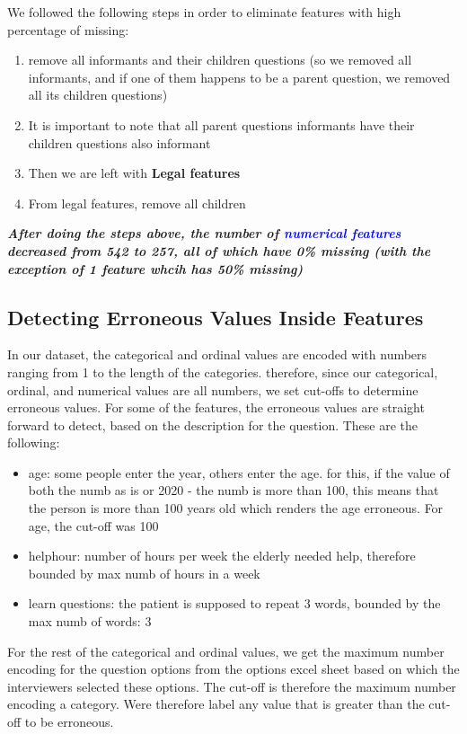 \documentclass{article}
\begin{document}
We followed the following steps in order to eliminate features with high percentage of missing:
\begin{enumerate}
\item remove all informants and their children questions (so we removed all informants, and if one of them happens to be a parent question, we removed all its children questions)

\item It is important to note that all parent questions informants have their children questions also informant

\item Then we are left with \textbf{Legal features}

\item From legal features, remove all children
\end{enumerate} 

\textbf{\textit{After doing the steps above, the number of \textcolor{blue}{numerical features} decreased from 542 to 257, all of which have 0\% missing (with the exception of 1 feature whcih has 50\% missing)}}

\subsection{Detecting Erroneous Values Inside Features}
In our dataset, the categorical and ordinal values are encoded with numbers ranging from 1 to the length of the categories. therefore, since our categorical, ordinal, and numerical values are all numbers, we set cut-offs to determine erroneous values. 
For some of the features, the erroneous values are straight forward to detect, based on the description for the question. These are the following:
\begin{itemize}
    \item age: some people enter the year, others enter the age. for this, if the value of both the numb as is or 2020 - the numb is more than 100, this means that the person is more than 100 years old which renders the age erroneous. For age, the cut-off was 100
    \item helphour: number of hours per week the elderly needed help, therefore bounded by max numb of hours in a week
    \item learn questions: the patient is supposed to repeat 3 words, bounded by the max numb of words: 3
\end{itemize}
For the rest of the categorical and ordinal values, we get the maximum number encoding for the question options from the options excel sheet based on which the interviewers selected these options. The cut-off is therefore the maximum number encoding a category. Were therefore label any value that is greater than the cut-off to be erroneous.
\end{document}
